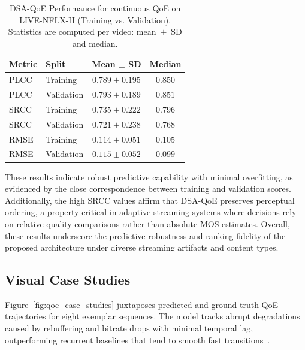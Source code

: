 \begin{table}[h]
    \centering
    \caption{DSA-QoE Performance for continuous QoE on LIVE-NFLX-II (Training vs. Validation). Statistics are computed per video: mean~$\pm$~SD and median.}
    \label{tab:overall_metrics}
    \begin{tabular}{llcc}
        \toprule
        Metric & Split & Mean $\pm$ SD & Median \\
        \midrule
        PLCC & Training & $0.789 \pm 0.195$ & $0.850$ \\
        PLCC & Validation & $0.793 \pm 0.189$ & $0.851$ \\
        SRCC & Training & $0.735 \pm 0.222$ & $0.796$ \\
        SRCC & Validation & $0.721 \pm 0.238$ & $0.768$ \\
        RMSE & Training & $0.114 \pm 0.051$ & $0.105$ \\
        RMSE & Validation & $0.115 \pm 0.052$ & $0.099$ \\
        \bottomrule
    \end{tabular}
\end{table}

These results indicate robust predictive capability with minimal overfitting, as evidenced by the close correspondence between training and validation scores. 
Additionally, the high SRCC values affirm that DSA-QoE preserves perceptual ordering, a property critical in adaptive streaming systems where decisions rely on 
relative quality comparisons rather than absolute MOS estimates. Overall, these results underscore the predictive robustness and ranking fidelity of the proposed 
architecture under diverse streaming artifacts and content types.

\subsection{Visual Case Studies}
\label{sec:visual_case_studies}

Figure~\ref{fig:qoe_case_studies} juxtaposes predicted and ground-truth QoE trajectories for eight exemplar sequences.  
The model tracks abrupt degradations caused by rebuffering and bitrate drops with minimal temporal lag, outperforming recurrent baselines that tend to smooth fast transitions~\cite{jia2024continuous}.  

